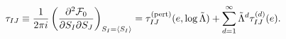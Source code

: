 \begin{equation}
\tau _{IJ}\equiv \frac{1}{2\pi i}\left( \frac{\partial ^{2}{\cal F}_{0}}{%
\partial S_{I}\partial S_{J}}\right) _{S_{I}=\langle S_{I}\rangle }=\tau
_{IJ}^{({\rm {pert})}}(e,\log \tilde{\Lambda})+\sum_{d=1}^{\infty }\tilde{%
\Lambda}^{d}\tau _{IJ}^{(d)}(e).  \label{Tij}
\end{equation}

